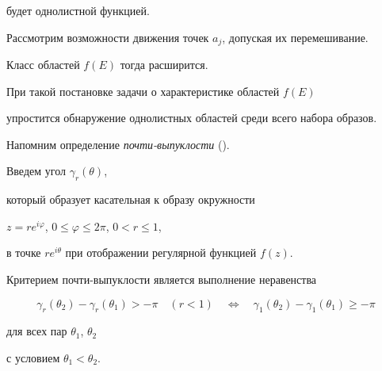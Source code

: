 

будет однолистной функцией.





Рассмотрим возможности движения точек $a_{j}$, допуская их перемешивание.


Класс областей $f(E)$ тогда расширится.


При такой постановке задачи о характеристике областей $f(E)$


упростится обнаружение однолистных областей среди всего набора образов.





Напомним определение {\em почти-выпуклости} (\cite{Kap}).


Введем угол $\gamma_{r} (\theta)$,


который образует касательная к образу окружности


$z=re^{i\varphi}$, $0\le \varphi \le 2\pi$, $0<r\le 1$,


в точке $re^{i\theta}$ при отображении регулярной функцией $f(z)$.


Критерием почти-выпуклости является выполнение неравенства


\begin{equation}


\gamma_{r} (\theta_{2})-\gamma _{r} (\theta _{1}) > -\pi \quad


(r<1) \quad


\Longleftrightarrow \quad


\gamma_{1} (\theta _{2})-\gamma _{1} (\theta _{1}) \ge -\pi


\end{equation}




для всех пар $\theta_{1}$, $\theta_{2}$


с условием $\theta _{1} < \theta _{2}$.





